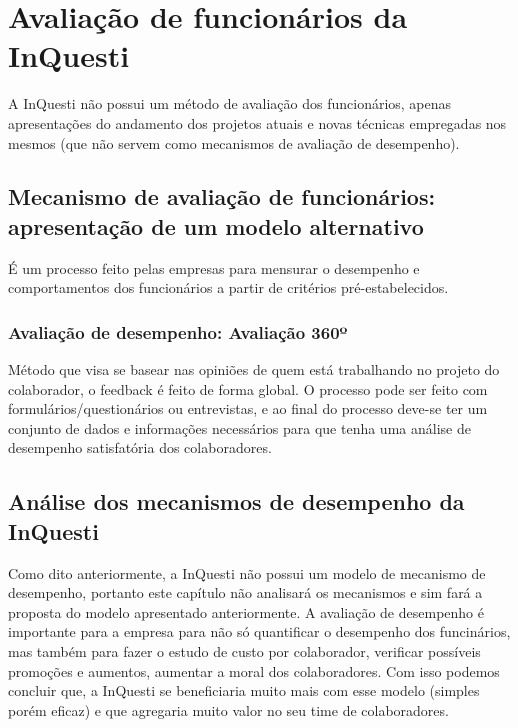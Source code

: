 \chapter{Avaliação de funcionários da InQuesti}
A InQuesti não possui um método de avaliação dos funcionários, apenas apresentações do andamento dos projetos atuais e novas
técnicas empregadas nos mesmos (que não servem como mecanismos de avaliação de desempenho).

\section{Mecanismo de avaliação de funcionários: apresentação de um modelo alternativo}
É um processo feito pelas empresas para mensurar o desempenho e comportamentos dos funcionários a partir de critérios pré-estabelecidos.

\subsection{Avaliação de desempenho: Avaliação 360º}
Método que visa se basear nas opiniões de quem está trabalhando no projeto do colaborador, o feedback é feito de forma global.
O processo pode ser feito com formulários/questionários ou entrevistas, e ao final do processo deve-se ter um conjunto de dados e informações 
necessários para que tenha uma análise de desempenho satisfatória dos colaboradores.

\section{Análise dos mecanismos de desempenho da InQuesti}
Como dito anteriormente, a InQuesti não possui um modelo de mecanismo de desempenho, portanto este capítulo não analisará os mecanismos e sim 
fará a proposta do modelo apresentado anteriormente.
A avaliação de desempenho é importante para a empresa para não só quantificar o desempenho dos funcinários, mas também para 
fazer o estudo de custo por colaborador, verificar possíveis promoções e aumentos, aumentar a moral dos colaboradores.
Com isso podemos concluir que, a InQuesti se beneficiaria muito mais com esse modelo (simples porém eficaz) e que agregaria muito valor no seu time de colaboradores.